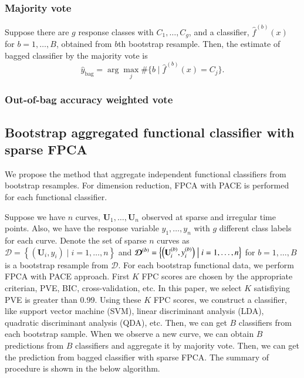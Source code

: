 \documentclass[eng]{csam}
\def \bU { \mathbf{ U } }
\def \bD { \boldsymbol{\mathcal{D}} }
\begin{document}
\subsubsection{Majority vote}
Suppose there are $g$ response classes with $C_1, \dots, C_g$, and a classifier, $\hat f^{(b)}(x)$ for $b=1, \dots, B$, obtained from $b$th bootstrap resample. Then, the estimate of bagged classifier by the majority vote is
\begin{equation*}
\hat y_{\text{bag}} = \arg\max_j \# \big\{ b \mid \hat f^{(b)}(x) = C_j \big\}.
\end{equation*}

\subsubsection{Out-of-bag accuracy weighted vote}


\subsection{Bootstrap aggregated functional classifier with sparse FPCA}
We propose the method that aggregate independent functional classifiers from bootstrap resamples. For dimension reduction, FPCA with PACE is performed for each functional classifier.


Suppose we have $n$ curves, $\bU_1, \dots, \bU_n$ observed at sparse and irregular time points. Also, we have the response variable $y_1,\dots,y_n$ with $g$ different class labels for each curve. Denote the set of sparse $n$ curves as $\bD = \left\{ \left( \bU_i, y_i \right) \mid i=1, \dots, n \right\}$ and $\bD^{(b)} = \left\{ \left( \bU^{(b)}_i, y^{(b)}_i \right) \bigm| i=1, \dots, n \right\}$ for $b=1,\dots,B$ is a bootstrap resample from $\bD$. For each bootstrap functional data, we perform FPCA with PACE approach. First $K$ FPC scores are chosen by the appropriate criterian, PVE, BIC, cross-validation, etc. In this paper, we select $K$ satisfiying PVE is greater than 0.99. Using these $K$ FPC scores, we construct a classifier, like support vector machine (SVM), linear discriminant analysis (LDA), quadratic discriminant analysis (QDA), etc. Then, we can get $B$ classifiers from each bootstrap sample. When we observe a new curve, we can obtain $B$ predictions from $B$ classifiers and aggregate it by majority vote. Then, we can get the prediction from bagged classifier with sparse FPCA. The summary of procedure is shown in the below algorithm.
\end{document}
